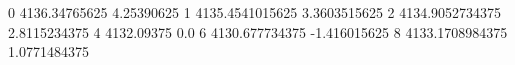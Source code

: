 0 4136.34765625 4.25390625
1 4135.4541015625 3.3603515625
2 4134.9052734375 2.8115234375
4 4132.09375 0.0
6 4130.677734375 -1.416015625
8 4133.1708984375 1.0771484375

